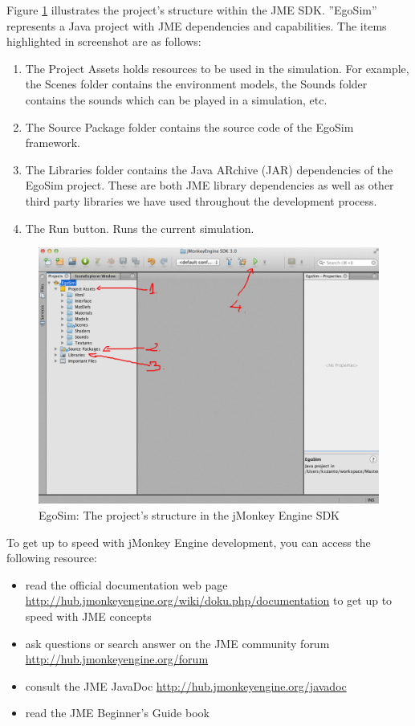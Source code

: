 Figure \ref{fig:egosim_structure} illustrates the project's structure within the JME SDK. ''EgoSim'' represents a Java project with JME dependencies and capabilities. The items highlighted in screenshot are as follows:
\begin{enumerate}
	\item The Project Assets holds resources to be used in the simulation. For example, the Scenes folder contains the environment models, the Sounds folder contains the sounds which can be played in a simulation, etc.
	\item The Source Package folder contains the source code of the EgoSim framework.
	\item The Libraries folder contains the Java ARchive (JAR) dependencies of the EgoSim project. These are both JME library dependencies as well as other third party libraries we have used throughout the development process.
	\item The Run button. Runs the current simulation.
\end{enumerate}

\begin{figure}[H]
	\centering
	\includegraphics[width=\linewidth]{gfx/Chapter4/project_structure_in_sdk}
	\caption{EgoSim: The project's structure in the jMonkey Engine SDK}
	\label{fig:egosim_structure}
\end{figure}

To get up to speed with jMonkey Engine development, you can access the following resource:
\begin{itemize}
	\item read the official documentation web page \url{http://hub.jmonkeyengine.org/wiki/doku.php/documentation} to get up to speed with JME concepts
	\item ask questions or search answer on the JME community forum \url{http://hub.jmonkeyengine.org/forum}
	\item consult the JME JavaDoc \url{http://hub.jmonkeyengine.org/javadoc}
	\item read the JME Beginner's Guide book \cite{kusterer2013jmonkeyengine}
\end{itemize}

